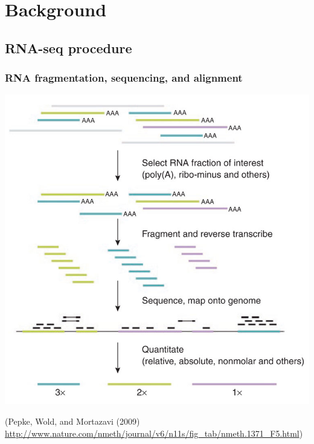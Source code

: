 \documentclass[handout,10pt]{beamer}
\begin{document}
\section{Background}
\subsection{RNA-seq procedure}

\begin{frame}
\frametitle{RNA fragmentation, sequencing, and alignment}
\begin{center}
\includegraphics{rnaseq3}
\end{center}
{\tiny (Pepke, Wold, and Mortazavi (2009) \url{http://www.nature.com/nmeth/journal/v6/n11s/fig_tab/nmeth.1371_F5.html})}
\end{frame}
\end{document}
